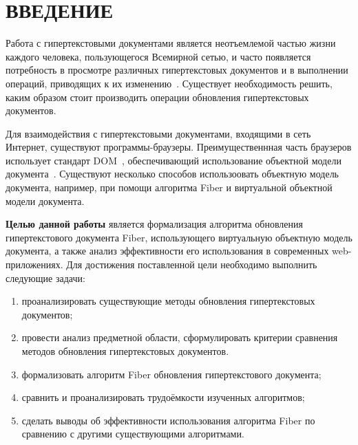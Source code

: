\section*{ВВЕДЕНИЕ}

Работа с гипертекстовыми документами является неотъемлемой частью жизни каждого человека, пользующегося Всемирной сетью, и часто появляется потребность в просмотре различных гипертекстовых документов и в выполнении операций, приводящих к их изменению~\cite{hypertext-popular}.
Существует необходимость решить, каким образом стоит производить операции обновления гипертекстовых документов.

Для взаимодействия с гипертекстовыми документами, входящими в сеть Интернет, существуют программы-браузеры.
Преимущественнная часть браузеров использует стандарт DOM~\cite{dom-doc}, обеспечивающий использование объектной модели документа~\cite{dom}.  
Существуют несколько способов использоовать объектную модель документа, например, при помощи алгоритма Fiber и виртуальной объектной модели документа.

\textbf{Целью данной работы} является формализация алгоритма обновления гипертекстового документа Fiber, использующего виртуальную объектную модель документа, а также анализ эффективности его использования в современных web-приложениях.
Для достижения поставленной цели необходимо выполнить следующие задачи:

\begin{enumerate}[label=\arabic*)]
	\item проанализировать существующие методы обновления гипертекстовых документов;
	\item провести анализ предметной области, сформулировать критерии сравнения методов обновления гипертекстовых документов.
	\item формализовать алгоритм Fiber обновления гипертекстового документа;
	\item сравнить и проанализировать трудоёмкости изученных алгоритмов;
	\item сделать выводы об эффективности использования алгоритма Fiber по сравнению с другими существующими алгоритмами.
\end{enumerate}


\pagebreak